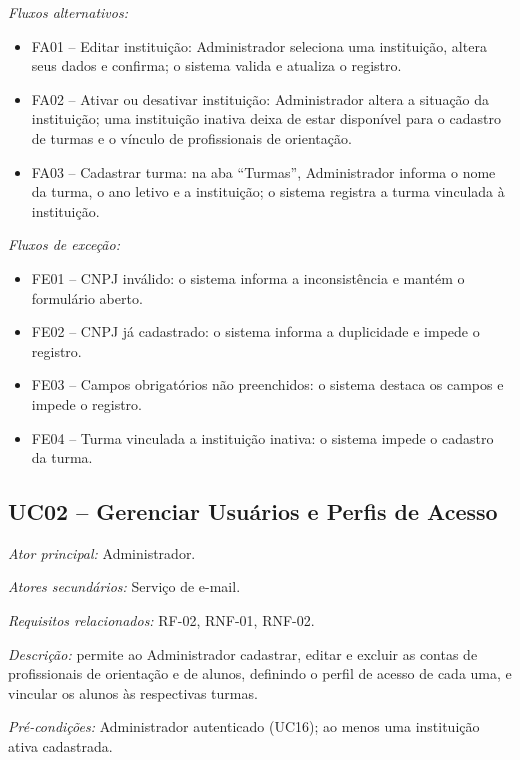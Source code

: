 \textit{Fluxos alternativos:}

\begin{itemize}[label={},leftmargin=\parindent,itemsep=0pt,topsep=0pt]
  \item FA01 – Editar instituição: Administrador seleciona uma instituição, altera seus dados e confirma; o sistema valida e atualiza o registro.
  \item FA02 – Ativar ou desativar instituição: Administrador altera a situação da instituição; uma instituição inativa deixa de estar disponível para o cadastro de turmas e o vínculo de profissionais de orientação.
  \item FA03 – Cadastrar turma: na aba ``Turmas'', Administrador informa o nome da turma, o ano letivo e a instituição; o sistema registra a turma vinculada à instituição.
\end{itemize}

\textit{Fluxos de exceção:}

\begin{itemize}[label={},leftmargin=\parindent,itemsep=0pt,topsep=0pt]
  \item FE01 – CNPJ inválido: o sistema informa a inconsistência e mantém o formulário aberto.
  \item FE02 – CNPJ já cadastrado: o sistema informa a duplicidade e impede o registro.
  \item FE03 – Campos obrigatórios não preenchidos: o sistema destaca os campos e impede o registro.
  \item FE04 – Turma vinculada a instituição inativa: o sistema impede o cadastro da turma.
\end{itemize}

\subsection*{UC02 -- Gerenciar Usuários e Perfis de Acesso}\label{uc:uc02}

\textit{Ator principal:} Administrador.

\textit{Atores secundários:} Serviço de e-mail.

\textit{Requisitos relacionados:} RF-02, RNF-01, RNF-02.

\textit{Descrição:} permite ao Administrador cadastrar, editar e excluir as contas de profissionais de orientação e de alunos, definindo o perfil de acesso de cada uma, e vincular os alunos às respectivas turmas.

\textit{Pré-condições:} Administrador autenticado (UC16); ao menos uma instituição ativa cadastrada.

